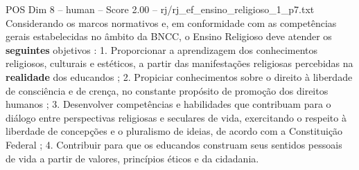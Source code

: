 \begin{textsample}{POS Dim 8 – human – Score 2.00 – rj/rj\_ef\_ensino\_religioso\_1\_p7.txt}  \label{ex:f8_pos_006}
Considerando os marcos normativos e, em conformidade com as competências gerais estabelecidas no âmbito da BNCC, o Ensino Religioso deve atender os \textbf{seguintes} objetivos : 1.
Proporcionar a aprendizagem dos conhecimentos religiosos, culturais e estéticos, a partir das manifestações religiosas percebidas na \textbf{realidade} dos educandos ; 2.
Propiciar conhecimentos sobre o direito à liberdade de consciência e de crença, no constante propósito de promoção dos direitos humanos ; 3.
Desenvolver competências e habilidades que contribuam para o diálogo entre perspectivas religiosas e seculares de vida, exercitando o respeito à liberdade de concepções e o pluralismo de ideias, de acordo com a Constituição Federal ; 4.
Contribuir para que os educandos construam seus sentidos pessoais de vida a partir de valores, princípios éticos e da cidadania.

\end{textsample}
